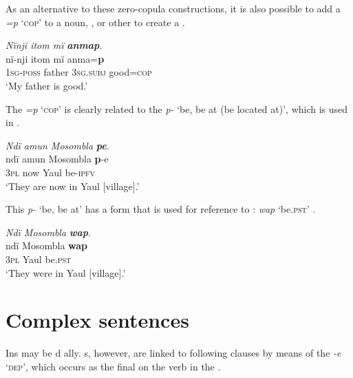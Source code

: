 As an alternative to these  zero-copula constructions, it is also possible to add a  \textit{=p} ‘\textsc{cop}’ to a noun, , or other  to create a  .

\ea%
    \label{ex:overview:59}
    \textit{Nïnji itom mï} \textbf{\textit{anmap}}.\\
\gll    nï-nji     itom  mï      anma=\textbf{p}\\
    1\textsc{sg-poss}  father  3\textsc{sg.subj}  good=\textsc{cop}\\
\glt    ‘My father is good.’
\z

The  \textit{=p} ‘\textsc{cop}’ is clearly related to the  \textit{p-} ‘be, be at (be located at)’, which is used in  .

\ea%
    \label{ex:overview:60}
    \textit{Ndï amun Mosombla} \textbf{\textit{pe}}.\\
\gll    ndï    amun  Mosombla    \textbf{p}{}-e\\
    3\textsc{pl}    now  Yaul      be-\textsc{ipfv}\\
\glt    ‘They are now in Yaul [village].’
\z

This  \textit{p-} ‘be, be at’ has a  form that is used for reference to  : \textit{wap} ‘be.\textsc{pst}’ .


\ea%
    \label{ex:overview:61}
    \textit{Ndï Mosombla} \textbf{\textit{wap}}.\\
\gll    ndï    Mosombla    \textbf{wap}\\
    3\textsc{pl}    Yaul      be.\textsc{pst}\\
\glt    ‘They were in Yaul [village].’
\z

\section{Complex sentences}\label{sec:overview:2.15}


Ins may be d ally. s, however, are linked to following clauses by means of the  \textit{{}-e} ‘\textsc{dep}’, which occurs as the final  on the verb in the  .

